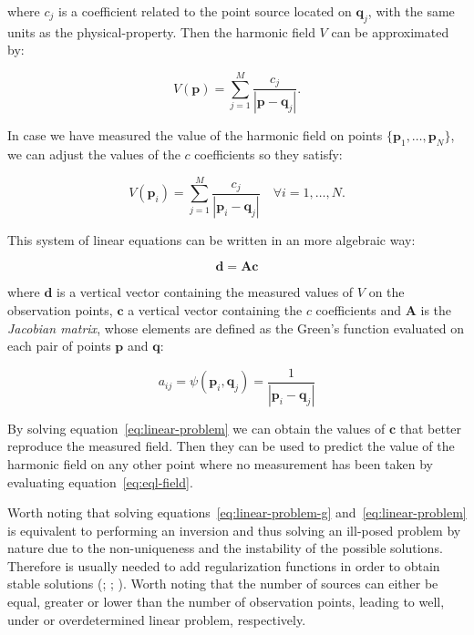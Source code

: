 \documentclass[twocolumn]{article}
\begin{document}
\noindent where $c_j$ is a coefficient related to the point source located on
$\mathbf{q}_j$, with the same units as the physical-property.
Then the harmonic field $V$ can be approximated by:

\begin{equation}
    V(\mathbf{p})
    =
    \sum\limits_{j=1}^{M} \frac{c_j}{|\mathbf{p} - \mathbf{q}_j|}.
    \label{eq:eql-field}
\end{equation}

In case we have measured the value of the harmonic field on points
$\{\mathbf{p}_1, \ldots, \mathbf{p}_N\}$, we can adjust the values of the $c$
coefficients so they satisfy:

\begin{equation}
    V(\mathbf{p}_i)
    =
    \sum\limits_{j=1}^{M} \frac{c_j}{|\mathbf{p}_i - \mathbf{q}_j|}
    \quad \forall i=1,\ldots,N.
\end{equation}

This system of linear equations can be written in an more algebraic way:

\begin{equation}
    \mathbf{d} = \mathbf{A} \mathbf{c}
    \label{eq:linear-problem}
\end{equation}

\noindent where $\mathbf{d}$ is a vertical vector containing the measured
values of $V$ on the observation points, $\mathbf{c}$ a vertical vector
containing the $c$ coefficients and $\mathbf{A}$ is the \emph{Jacobian matrix},
whose elements are defined as the Green's function evaluated on each pair of
points $\mathbf{p}$ and $\mathbf{q}$:

\begin{equation}
    a_{ij}
    =
    \psi(\mathbf{p}_i, \mathbf{q}_j)
    =
    \frac{1}{|\mathbf{p}_i - \mathbf{q}_j|}
\end{equation}

By solving equation~\ref{eq:linear-problem} we can obtain the values of
$\mathbf{c}$ that better reproduce the measured field.
Then they can be used to predict the value of the harmonic field on any other
point where no measurement has been taken by evaluating
equation~\ref{eq:eql-field}.

Worth noting that solving equations~\ref{eq:linear-problem-g}
and~\ref{eq:linear-problem} is equivalent to performing an inversion and thus
solving an ill-posed problem by nature due to the non-uniqueness and the
instability of the possible solutions.
Therefore is usually needed to add regularization functions in order to obtain
stable solutions
(\citealp[p.~52]{menke1989}; \citealp{cooper2000}; \citealp{oliveira2013}).
Worth noting that the number of sources can either be equal, greater or lower
than the number of observation points, leading to well, under or overdetermined
linear problem, respectively.
\end{document}
